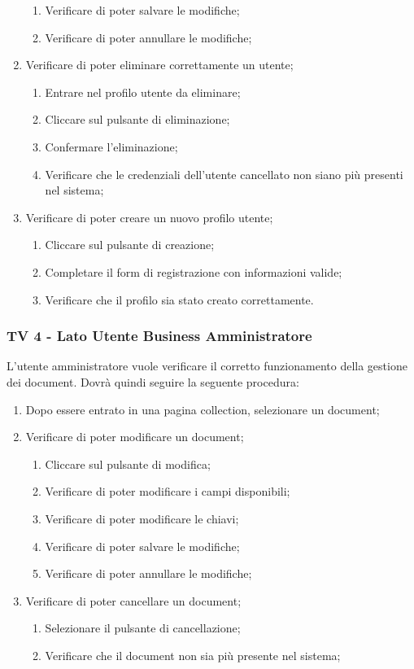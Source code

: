 \begin{enumerate}
\begin{enumerate}
\item Verificare di poter salvare le modifiche;
\item Verificare di poter annullare le modifiche;
\end{enumerate}
\item Verificare di poter eliminare correttamente un utente;
\begin{enumerate}
\item Entrare nel profilo utente da eliminare;
\item Cliccare sul pulsante di eliminazione;
\item Confermare l'eliminazione;
\item Verificare che le credenziali dell'utente cancellato non siano più presenti nel sistema;
\end{enumerate}
\item Verificare di poter creare un nuovo profilo utente;
\begin{enumerate}
\item Cliccare sul pulsante di creazione;
\item Completare il form di registrazione con informazioni valide;
\item Verificare che il profilo sia stato creato correttamente.
\end{enumerate}
\end{enumerate}


\subsubsection{TV 4 - Lato Utente Business Amministratore}

L’utente amministratore vuole verificare il corretto funzionamento della gestione dei document.
Dovrà quindi seguire la seguente procedura:


\begin{enumerate}
\item Dopo essere entrato in una pagina collection, selezionare un document;
\item Verificare di poter modificare un document;
\begin{enumerate}
\item Cliccare sul pulsante di modifica;
\item Verificare di poter modificare i campi disponibili;
\item Verificare di poter modificare le chiavi;
\item Verificare di poter salvare le modifiche;
\item Verificare di poter annullare le modifiche;
\end{enumerate}
\item Verificare di poter cancellare un document;
\begin{enumerate}
\item Selezionare il pulsante di cancellazione;
\item Verificare che il document non sia più presente nel sistema;
\end{enumerate}
\end{enumerate}

